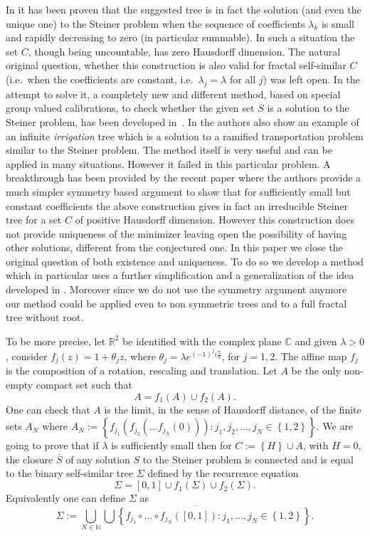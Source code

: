 \documentclass{amsart}
\newcommand{\RR}{\mathbb R}
\newcommand{\CC}{\mathbb C}
\newcommand{\NN}{\mathbb N}
\newcommand{\ENCLOSE}[1]{\left\{#1\right\}}
\theoremstyle{definition}
\theoremstyle{remark}
\begin{document}
In \cite{PaoSteTep15} it has been proven that 
the suggested tree is in fact the solution (and even the unique one) 
to the Steiner problem when the sequence of coefficients $\lambda_k$
is small and rapidly decreasing to zero (in particular summable).
In such a situation the set $C$, though being uncountable,
has zero Hausdorff dimension.
The natural original question, whether this construction is also valid 
for fractal self-similar $C$ (i.e.\ when the coefficients are constant,
i.e.\ $\lambda_j=\lambda$ for all $j$)
was left open.
In the attempt to solve it, a 
completely new and different method, based on special group valued calibrations,
to check whether the given set $S$ is a solution to the Steiner problem,
has been developed in~\cite{MarMas16a}.
In \cite{MarMas16b} the authors also show an example 
of an infinite \emph{irrigation} tree which is a solution to
a ramified transportation problem similar to the Steiner problem.
The method itself is very useful and can be applied in many situations.
However it failed in this particular problem.
A breakthrough has been provided by the recent paper \cite{CheTep23}
where the authors provide a much simpler symmetry based argument to show that for 
sufficiently small but constant coefficients the above construction 
gives in fact an irreducible Steiner tree for a set $C$ 
of positive Hausdorff dimension.
However this construction does not provide uniqueness of 
the minimizer leaving open the possibility of having other solutions, 
different from the conjectured one.
In this paper 
we close the original question of both existence and uniqueness.
To do so we develop a method which in particular uses 
a further simplification and a generalization of 
the idea developed in \cite{CheTep23}.
Moreover since we do not use the symmetry argument anymore our method 
could be applied even to non symmetric trees and to a full fractal tree 
without root.

To be more precise, 
let $\RR^2$ be identified with the complex plane $\CC$
and given $\lambda>0$, 
consider $f_j(z) = 1 + \theta_j z$,
where $\theta_j = \lambda e^{(-1)^j i \frac \pi 3}$,
for $j=1,2$. 
The affine map $f_j$ is the composition of a rotation,
rescaling and translation. 
Let $A$ be the only non-empty compact set such that 
\[
  A = f_1(A) \cup f_2(A).  
\]
One can check that $A$ is the limit, 
in the sense of Hausdorff distance,
of the finite sets $A_N$ where $A_N:=\ENCLOSE{f_{j_1}(f_{j_2}(\dots f_{j_N}(0)))\colon 
j_1,j_2, \dots, j_N \in \ENCLOSE{1,2}}$.
We are going to prove that if $\lambda$ is sufficiently 
small then 
for $C:=\ENCLOSE{H}\cup A$, with $H=0$, the closure $\bar S$ of any solution 
$S$ to the Steiner problem 
is connected and is equal to the binary self-similar 
tree $\Sigma$ defined by the recurrence equation
\[
  \Sigma = [0,1] \cup f_1(\Sigma) \cup f_2(\Sigma).
\]
Equivalently one can define $\Sigma$ as
\[
  \Sigma := \overline{\bigcup_{N \in \NN}  
  \bigcup\ENCLOSE{f_{j_1}\circ \dots \circ f_{j_N}([0,1])\colon 
  j_1, \dots, j_N \in \ENCLOSE{1,2}}}.
\]
\end{document}

